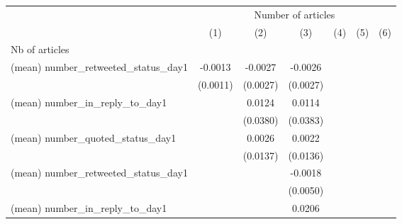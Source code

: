 {
\def\sym#1{\ifmmode^{#1}\else\(^{#1}\)\fi}
\begin{tabular}{l*{6}{c}}
\hline\hline
                    &\multicolumn{6}{c}{Number of articles}                                                                                             \\\cmidrule(lr){2-7}
                    &\multicolumn{1}{c}{(1)}         &\multicolumn{1}{c}{(2)}         &\multicolumn{1}{c}{(3)}         &\multicolumn{1}{c}{(4)}         &\multicolumn{1}{c}{(5)}         &\multicolumn{1}{c}{(6)}         \\
\hline
Nb of articles      &                     &                     &                     &                     &                     &                     \\
(mean) number\_retweeted\_status\_day1&     -0.0013         &     -0.0027         &     -0.0026         &                     &                     &                     \\
                    &    (0.0011)         &    (0.0027)         &    (0.0027)         &                     &                     &                     \\
(mean) number\_in\_reply\_to\_day1&                     &      0.0124         &      0.0114         &                     &                     &                     \\
                    &                     &    (0.0380)         &    (0.0383)         &                     &                     &                     \\
(mean) number\_quoted\_status\_day1&                     &      0.0026         &      0.0022         &                     &                     &                     \\
                    &                     &    (0.0137)         &    (0.0136)         &                     &                     &                     \\
(mean) number\_retweeted\_status\_day1&                     &                     &     -0.0018         &                     &                     &                     \\
                    &                     &                     &    (0.0050)         &                     &                     &                     \\
(mean) number\_in\_reply\_to\_day1&                     &                     &      0.0206         &                     &                     &                     \\

\end{tabular}}
